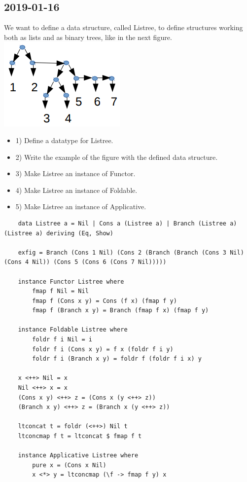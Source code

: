  
\subsection{2019-01-16}
We want to define a data structure, called Listree, to define structures working both as lists and as binary
trees, like in the next figure.
\includegraphics{haskell/2019-02-08.png}
\begin{itemize}
    \item 1) Define a datatype for Listree.
    \item 2) Write the example of the figure with the defined data structure.
    \item 3) Make Listree an instance of Functor.
    \item 4) Make Listree an instance of Foldable.
    \item 5) Make Listree an instance of Applicative.
\end{itemize}
\begin{lstlisting}
    data Listree a = Nil | Cons a (Listree a) | Branch (Listree a)(Listree a) deriving (Eq, Show)

    exfig = Branch (Cons 1 Nil) (Cons 2 (Branch (Branch (Cons 3 Nil) (Cons 4 Nil)) (Cons 5 (Cons 6 (Cons 7 Nil)))))

    instance Functor Listree where
        fmap f Nil = Nil
        fmap f (Cons x y) = Cons (f x) (fmap f y)
        fmap f (Branch x y) = Branch (fmap f x) (fmap f y)

    instance Foldable Listree where
        foldr f i Nil = i
        foldr f i (Cons x y) = f x (foldr f i y)
        foldr f i (Branch x y) = foldr f (foldr f i x) y

    x <++> Nil = x
    Nil <++> x = x
    (Cons x y) <++> z = (Cons x (y <++> z))
    (Branch x y) <++> z = (Branch x (y <++> z))

    ltconcat t = foldr (<++>) Nil t
    ltconcmap f t = ltconcat $ fmap f t

    instance Applicative Listree where
        pure x = (Cons x Nil)
        x <*> y = ltconcmap (\f -> fmap f y) x
\end{lstlisting}


